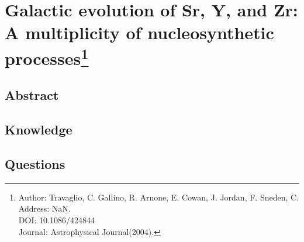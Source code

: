 \section[Galactic evolution of Sr, Y, and Zr: A multiplicity of nucleosynthetic processes]{Galactic evolution of Sr, Y, and Zr: A multiplicity of nucleosynthetic processes\protect\footnote{Author: Travaglio, C. Gallino, R. Arnone, E. Cowan, J. Jordan, F. Sneden, C. \\Address: NaN. \\DOI: 10.1086/424844 \\Journal: Astrophysical Journal(2004).}}
\subsection{Abstract}

\subsection{Knowledge}

\subsection{Questions}